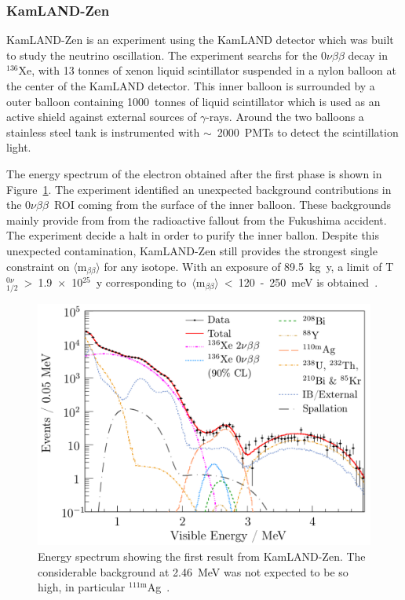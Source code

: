 \documentclass[main.tex]{subfiles}
\begin{document}
\subsubsection{KamLAND-Zen}


\NI KamLAND-Zen is an experiment using the KamLAND detector which was built to study the neutrino oscillation. The experiment searchs for the 0$\nu\beta\beta$ decay in~$^{\text{136}}$Xe, with 13 tonnes of xenon liquid scintillator suspended in a nylon balloon at the center of the KamLAND detector. This inner balloon is surrounded by a outer balloon containing 1000~tonnes of liquid scintillator which is used as an active shield against external sources of $\gamma$-rays. Around the two balloons a stainless steel tank is instrumented with $\sim$~2000~PMTs to detect the scintillation light.


\bigskip


\NI The energy spectrum of the electron obtained after the first phase is shown in Figure~\ref{KamLANDZenResults}. The experiment identified an unexpected background contributions in the 0$\nu\beta\beta$~ROI coming from the surface of the inner balloon. These backgrounds mainly provide from from the radioactive fallout from the Fukushima accident. The experiment decide a halt in order to purify the inner ballon. Despite this unexpected contamination, KamLAND-Zen still provides the strongest single constraint on $\langle \text{m}_{\beta\beta} \rangle$ for any isotope. With an exposure of 89.5~kg~y, a limit of T$_{\text{1/2}}^{0\nu}$~>~1.9~$\times$~10$^{\text{25}}$~y corresponding to~$\langle \text{m}_{\beta\beta} \rangle$~<~120~-~250~meV is obtained~\cite{KamLAND-Zen}.



\begin{figure}[h!]
\begin{center}
\includegraphics[scale=0.3]{pictures/Chap2/KamLANDZenResults.png}
\caption{Energy spectrum showing the first result from KamLAND-Zen. The considerable background at 2.46~MeV was not expected to be so high, in particular $^{\text{111m}}$Ag~\cite{KamLAND-Zen}.}
\label{KamLANDZenResults}
\end{center}
\end{figure}
\end{document}
